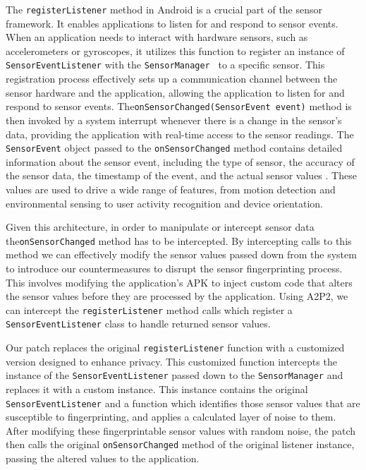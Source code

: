 \documentclass[11pt,
  oneside,openany,    %
]{scrreprt}
\begin{document}
The \verb|registerListener| method in Android is a crucial part of the sensor framework. 
It enables applications to listen for and respond to sensor events.
When an application needs to interact with hardware sensors, such as accelerometers or gyroscopes, it utilizes this function to register an instance of \verb|SensorEventListener| with the \verb|SensorManager|~\cite{android_sensormanager} to a specific sensor.
This registration process effectively sets up a communication channel between the sensor hardware and the application, allowing the application to listen for and respond to sensor events.
The\linebreak\verb|onSensorChanged(SensorEvent event)| method is then invoked by a system interrupt whenever there is a change in the sensor's data, providing the application with real-time access to the sensor readings.
The \verb|SensorEvent| object passed to the \verb|onSensorChanged| method contains detailed information about the sensor event, including the type of sensor, the accuracy of the sensor data, the timestamp of the event, and the actual sensor values \cite{android_sensorevent}.
These values are used to drive a wide range of features, from motion detection and environmental sensing to user activity recognition and device orientation.

Given this architecture, in order to manipulate or intercept sensor data the\linebreak\verb|onSensorChanged| method has to be intercepted.
By intercepting calls to this method we can effectively modify the sensor values passed down from the system to introduce our countermeasures to disrupt the sensor fingerprinting process.
This involves modifying the application's APK to inject custom code that alters the sensor values before they are processed by the application.
Using A2P2, we can intercept the \verb|registerListener| method calls which register a \verb|SensorEventListener| class to handle returned sensor values.

Our patch replaces the original \verb|registerListener| function with a customized version designed to enhance privacy.
This customized function intercepts the instance of the \verb|SensorEventListener| passed down to the \verb|SensorManager| and replaces it with a custom instance.
This instance contains the original \verb|SensorEventListener| and a function which identifies those sensor values that are susceptible to fingerprinting, and applies a calculated layer of noise to them.
After modifying these fingerprintable sensor values with random noise, the patch then calls the original \verb|onSensorChanged| method of the original listener instance, passing the altered values to the application.
\end{document}
